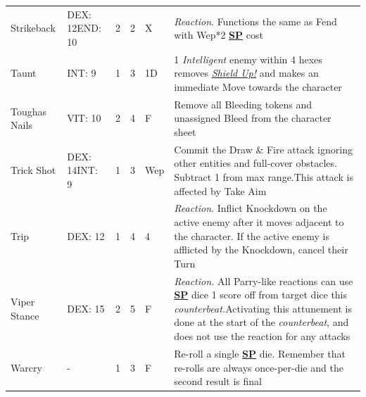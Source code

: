 \documentclass[12pt]{article}
\newcommand{\refto}[1]{\hyperlink{#1}{\textbf{#1}}}
\newcommand{\reftoit}[1]{\hyperlink{#1}{\emph{#1}}}
\begin{document}
\begin{center}
\begin{tabularx}{\textwidth}{p{}p{}p{}p{}p{}p{}}
Strikeback & DEX: 12\newline END: 10 & 2 & 2 & X & \emph{Reaction}. Functions the same as Fend with Wep*2 \refto{SP} cost\\
Taunt & INT: 9 & 1 & 3 & 1D & 1 \emph{Intelligent} enemy within 4 hexes removes \reftoit{Shield Up!} and makes an immediate Move towards the character \\
Tough\newline as Nails & VIT: 10 & 2 & 4 & F & Remove all Bleeding tokens and unassigned Bleed from the character sheet\\
Trick Shot & DEX: 14\newline INT: 9 & 1 & 3 & Wep & Commit the Draw \& Fire attack ignoring other entities and full-cover obstacles. Subtract 1 from max range.\newline This attack is affected by Take Aim\\
Trip & DEX: 12 & 1 & 4 & 4 & \emph{Reaction}. Inflict Knockdown on the active enemy after it moves adjacent to the character. If the active enemy is afflicted by the Knockdown, cancel their Turn\\
Viper Stance & DEX: 15 & 2 & 5 & F & \emph{Reaction.} All Parry-like reactions can use \refto{SP} dice 1 score off from target dice this \emph{counterbeat.}\newline Activating this attunement is done at the start of the \emph{counterbeat}, and does not use the reaction for any attacks\\
Warcry & - & 1 & 3 & F & Re-roll a single \refto{SP} die. Remember that re-rolls are always once-per-die and the second result is final\\
\hline
\end{tabularx}
\end{center}

\pagebreak
\end{document}
